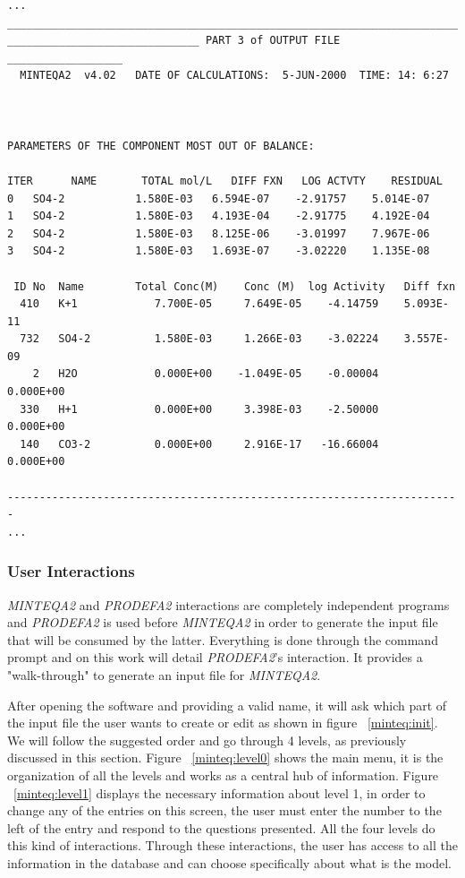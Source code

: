 \documentclass[ppgc,mestrado,English]{iiufrgs}
\begin{document}
\begin{minipage}[c]{0.93\textwidth}
\begin{lstlisting}[frame=single, caption=\emph{MINTEQA2}'s excerpt from the output file, label=minteqa2:output]
...
_______________________________________________________________________
______________________________ PART 3 of OUTPUT FILE __________________
  MINTEQA2  v4.02   DATE OF CALCULATIONS:  5-JUN-2000  TIME: 14: 6:27



PARAMETERS OF THE COMPONENT MOST OUT OF BALANCE:

ITER      NAME       TOTAL mol/L   DIFF FXN   LOG ACTVTY    RESIDUAL
0   SO4-2           1.580E-03   6.594E-07    -2.91757    5.014E-07
1   SO4-2           1.580E-03   4.193E-04    -2.91775    4.192E-04
2   SO4-2           1.580E-03   8.125E-06    -3.01997    7.967E-06
3   SO4-2           1.580E-03   1.693E-07    -3.02220    1.135E-08

 ID No  Name        Total Conc(M)    Conc (M)  log Activity   Diff fxn
  410   K+1            7.700E-05     7.649E-05    -4.14759    5.093E-11
  732   SO4-2          1.580E-03     1.266E-03    -3.02224    3.557E-09
    2   H2O            0.000E+00    -1.049E-05    -0.00004    0.000E+00
  330   H+1            0.000E+00     3.398E-03    -2.50000    0.000E+00
  140   CO3-2          0.000E+00     2.916E-17   -16.66004    0.000E+00

-----------------------------------------------------------------------
...
\end{lstlisting}
\end{minipage}

\subsubsection{User Interactions}\label{minteq:interactions}
\emph{MINTEQA2} and \emph{PRODEFA2} interactions are completely independent programs and \emph{PRODEFA2} is used before \emph{MINTEQA2} in order to generate the input file that will be consumed by the latter. Everything is done through the command prompt and on this work will detail \emph{PRODEFA2}'s interaction. It provides a "walk-through" to generate an input file for \emph{MINTEQA2}.

After opening the software and providing a valid name, it will ask which part of the input file the user wants to create or edit as shown in figure ~\ref{minteq:init}. We will follow the suggested order and go through 4 levels, as previously discussed in this section. Figure ~\ref{minteq:level0} shows the main menu, it is the organization of all the levels and works as a central hub of information. Figure ~\ref{minteq:level1} displays the necessary information about level 1,     in order to change any of the entries on this screen, the user must enter the number to the left of the entry and respond to the questions presented. All the four levels do this kind of interactions. Through these interactions, the user has access to all the information in the database and can choose specifically about what is the model.
\end{document}
